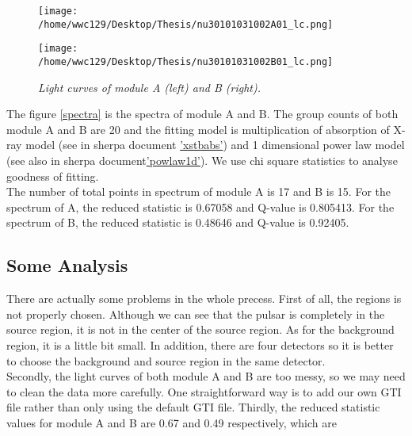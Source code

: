 \documentclass[12pt]{report}
\newcommand{\mycaption}[1]{\caption{\textit{\footnotesize #1}}}
\begin{document}
        \begin{figure}[h]
          \begin{minipage}{0.45\textwidth}
            \begin{flushleft}
                \texttt{[image: /home/wwc129/Desktop/Thesis/nu30101031002A01\_lc.png]}
              \end{flushleft}
            \end{minipage}
          \hspace{0.1cm} 
          \begin{minipage}{0.45\textwidth}
            \texttt{[image: /home/wwc129/Desktop/Thesis/nu30101031002B01\_lc.png]}
          \end{minipage}
          \mycaption{Light curves of module A (left) and B (right).}
          \label{fig:lightcurves}
        \end{figure}
        \indent The figure \ref{spectra} is the spectra of module A and B. The group counts of both module A and B are
        20 and the fitting model is multiplication of absorption of X-ray model (see in sherpa document 
        \href{http://%
        cxc.harvard.edu/sherpa/ahelp/xstbabs.html}{'xstbabs'}) and 1 dimensional power law model (see also in sherpa 
        document\href{http://cxc.harvard.edu/sherpa/ahelp/powlaw1d.html}{'powlaw1d'}). We use chi square statistics
        to analyse goodness of fitting.\\
        \indent
        The number of total points in spectrum of module A is 17 and B is 15. For the spectrum of A, the 
        reduced statistic is 0.67058 and Q-value is 0.805413. For the spectrum of B, the reduced statistic is 0.48646
        and Q-value is 0.92405. 
        \subsection*{Some Analysis}
        \indent There are actually some problems in the whole precess. First of all, the regions is not properly 
        chosen. Although we can see that the pulsar is completely in the source region, it is not in the center of 
        the source region. As for the background region, it is a little bit small. In addition, there are four 
        detectors so it is better to choose the background and source region in the same detector. \\
        \indent Secondly, the light curves of both module A and B are too messy, so we may need to clean the data
        more carefully. One straightforward way is to add our own GTI file rather than only using the default GTI 
        file. Thirdly, the reduced statistic values for module A and B are 0.67 and 0.49 respectively, which are 
        
\end{document}
